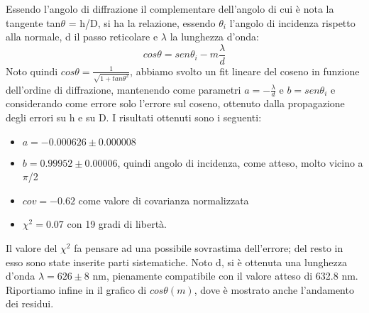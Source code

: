 Essendo l'angolo di diffrazione il complementare dell'angolo di cui è nota la tangente tan$\theta$ = h/D, si ha la relazione, essendo $\theta_i$ l'angolo di incidenza rispetto alla normale, d il passo reticolare e $\lambda$ la lunghezza d'onda:
\begin{equation}
cos\theta = sen\theta_i - m \frac{\lambda}{d}
\label{legge_diffrazione}
\end{equation}
Noto quindi $cos\theta = \frac {1}{\sqrt{1+tan\theta ^2}}$, abbiamo svolto un fit lineare del coseno in funzione dell'ordine di diffrazione, mantenendo come parametri $a = -\frac{\lambda}{d}$ e $b = sen\theta_i$ e considerando come errore solo l'errore sul coseno, ottenuto dalla propagazione degli errori su h e su D. I risultati ottenuti sono i seguenti:
\begin{itemize}
\item $a = -0.000626 \pm 0.000008$
\item $b = 0.99952 \pm 0.00006$, quindi angolo di incidenza, come atteso, molto vicino a $\pi$/2
\item $cov = -0.62$ come valore di covarianza normalizzata
\item $\chi^2 = 0.07$ con 19 gradi di libertà.
\end{itemize}
Il valore del $\chi^2$ fa pensare ad una possibile sovrastima dell'errore; del resto in esso sono state inserite parti sistematiche. Noto d, si è ottenuta una lunghezza d'onda $\lambda = 626 \pm 8$ nm, pienamente compatibile con il valore atteso di 632.8 nm. Riportiamo infine in  il grafico di $cos\theta (m)$, dove è mostrato anche l'andamento dei residui.


